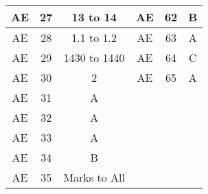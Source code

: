 \begin{tabular}[12pt]{ |c|c|c|c|c|c| }
    \hline
    AE & 27 & 13 to 14 & AE & 62 & B \\
    \hline
    AE & 28 & 1.1 to 1.2 & AE & 63 & A \\
    \hline
    AE & 29 & 1430 to 1440 & AE & 64 & C \\
    \hline
    AE & 30 & 2 & AE & 65 & A \\
    \hline
    AE & 31 & A & & & \\
    \hline
    AE & 32 & A & & & \\
    \hline
    AE & 33 & A & & & \\
    \hline
    AE & 34 & B & & & \\
    \hline
    AE & 35 & Marks to All & & & \\
    \hline
\end{tabular}
